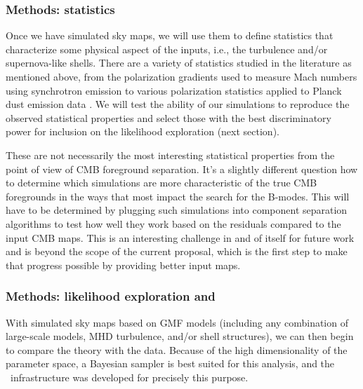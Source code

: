 \subsubsection*{Methods:  statistics}

Once we have simulated sky maps, we will use them to define statistics that characterize some physical aspect of the inputs, i.e., the turbulence and/or supernova-like shells.  There are a variety of statistics studied in the literature as mentioned above, from the polarization gradients used to measure Mach numbers using synchrotron emission \citep{Burkhart:2012} to various polarization statistics applied to Planck dust emission data \citep{pipXX,pipXXXIII}.  We will test the ability of our simulations to reproduce the observed statistical properties and select those with the best discriminatory power for inclusion on the likelihood exploration (next section).  

These are not necessarily the most interesting statistical properties from the point of view of CMB foreground separation.  It's a slightly different question how to determine which simulations are more characteristic of the true CMB foregrounds in the ways that most impact the search for the B-modes.  This will have to be determined by plugging such simulations into component separation algorithms to test how well they work based on the residuals compared to the input CMB maps.  This is an interesting challenge in and of itself for future work and is beyond the scope of the current proposal, which is the first step to make that progress possible by providing better input maps.  


\subsubsection*{Methods:  likelihood exploration and \imagineSW\ }

With simulated sky maps based on GMF models (including any combination of large-scale models, MHD turbulence, and/or shell structures), we can then begin to compare the theory with the data. Because of the high dimensionality of the parameter space, a Bayesian sampler is best suited for this analysis, and the \imagine\ infrastructure was developed for precisely this purpose.  

